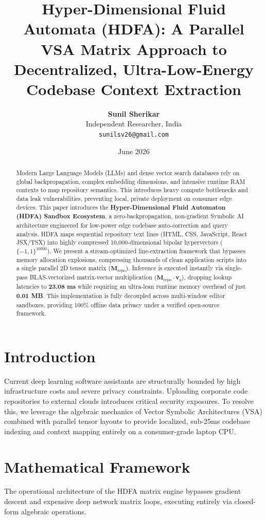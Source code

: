 \documentclass[twocolumn,10pt,journal]{article}
\title{\textbf{Hyper-Dimensional Fluid Automata (HDFA): A Parallel VSA Matrix Approach to Decentralized, Ultra-Low-Energy Codebase Context Extraction}}
\author{\textbf{Sunil Sherikar} \\ \small Independent Researcher, India \\ \small \texttt{sunilsv26@gmail.com}}
\date{June 2026}
\begin{document}
\maketitle

\begin{abstract}
Modern Large Language Models (LLMs) and dense vector search databases rely on global backpropagation, complex embedding dimensions, and intensive runtime RAM contexts to map repository semantics. This introduces heavy compute bottlenecks and data leak vulnerabilities, preventing local, private deployment on consumer edge devices. This paper introduces the \textbf{Hyper-Dimensional Fluid Automaton (HDFA) Sandbox Ecosystem}, a zero-backpropagation, non-gradient Symbolic AI architecture engineered for low-power edge codebase auto-correction and query analysis. HDFA maps sequential repository text lines (HTML, CSS, JavaScript, React JSX/TSX) into highly compressed 10,000-dimensional bipolar hypervectors ($\{-1, 1\}^{10000}$). We present a stream-optimized line-extraction framework that bypasses memory allocation explosions, compressing thousands of clean application scripts into a single parallel 2D tensor matrix ($\mathbf{M}_{\text{repo}}$). Inference is executed instantly via single-pass BLAS-vectorized matrix-vector multiplication ($\mathbf{M}_{\text{repo}} \cdot \mathbf{v}_q$), dropping lookup latencies to \textbf{23.08 ms} while requiring an ultra-lean runtime memory overhead of just \textbf{0.01 MB}. This implementation is fully decoupled across multi-window editor sandboxes, providing 100\% offline data privacy under a verified open-source framework.
\end{abstract}

\section{Introduction}
Current deep learning software assistants are structurally bounded by high infrastructure costs and severe privacy constraints. Uploading corporate code repositories to external clouds introduces critical security exposures. To resolve this, we leverage the algebraic mechanics of Vector Symbolic Architectures (VSA) combined with parallel tensor layouts to provide localized, sub-25ms codebase indexing and context mapping entirely on a consumer-grade laptop CPU.

\section{Mathematical Framework}
The operational architecture of the HDFA matrix engine bypasses gradient descent and expensive deep network matrix loops, executing entirely via closed-form algebraic operations.
\end{document}
